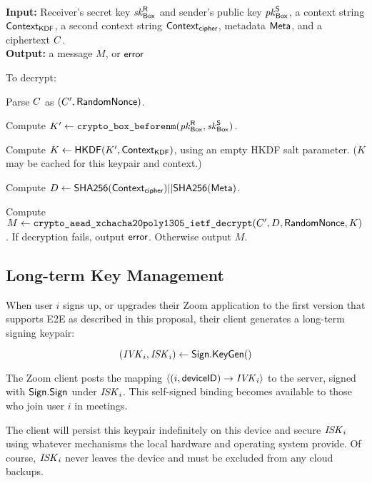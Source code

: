 
{\underline {\bf \cboxdecrypt}} \\
{\bf Input:} Receiver's secret key $\mathit{sk}_{{\sf Box}}^{\sf R}$ and sender's public key $\mathit{pk}_{{\sf Box}}^{\sf S}$, a context string ${\sf Context}_\textsf{KDF}$, a second context string ${\sf Context}_\textsf{cipher}$, metadata ${\sf Meta}$, and a ciphertext $C$. \\
{\bf Output:} a message $M$, or ${\sf error}$

To decrypt:

\vspace{-1em}
\begingroup
\RaggedRight
\begin{enumerate*}
\item Parse $C$ as $(C', {\sf RandomNonce})$.
\item Compute $K' \leftarrow \texttt{crypto\_box\_beforenm}(\mathit{pk}_{{\sf Box}}^{\sf R}, \mathit{sk}_{{\sf Box}}^{\sf S})$.
\item Compute $K \leftarrow {\sf HKDF}(K', {\sf Context}_\textsf{KDF})$, using an empty HKDF salt parameter. ($K$ may be cached for this keypair and context.)
\item Compute $D \leftarrow {\sf SHA256}({\sf Context}_\textsf{cipher}) || {\sf SHA256}({\sf Meta})$.
\item Compute $M \leftarrow \texttt{crypto\_aead\_xchacha20poly1305\_ietf\_decrypt}(C', D, {\sf RandomNonce}, K)$. If decryption fails, output ${\sf error}$. Otherwise output $M$.
\end{enumerate*}
\endgroup

\subsection{Long-term Key Management}
\label{sec:keymanage}

When user $i$ signs up, or upgrades their Zoom application to the first version that supports E2E as described in this proposal, their client generates a long-term signing keypair:

\[
(\mathit{IVK}_i, \mathit{ISK}_i) \leftarrow {\sf Sign}.\mathsf{KeyGen}()
\]

The Zoom client posts the mapping $\langle (i, {\sf deviceID}) \rightarrow \mathit{IVK}_i \rangle$ to the server, signed with ${\sf Sign}.\mathsf{Sign}$ under $\mathit{ISK}_i$. This self-signed binding becomes available to those who join user $i$ in meetings.

The client will persist this keypair indefinitely on this device and secure $\mathit{ISK}_i$ using whatever mechanisms the local hardware and operating system provide. Of course, $\mathit{ISK}_i$ never leaves the device and must be excluded from any cloud backups.

